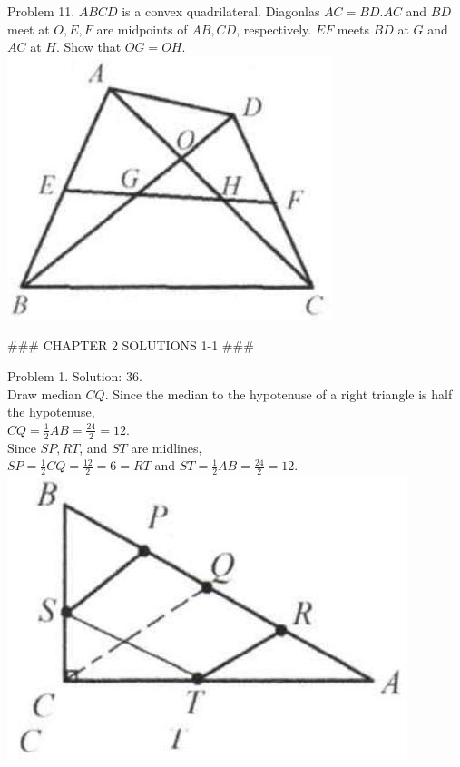 \documentclass[10pt]{article}
\begin{document}
Problem 11. \(A B C D\) is a convex quadrilateral. Diagonlas \(A C=B D . A C\) and \(B D\) meet at \(O, E, F\) are midpoints of \(A B, C D\), respectively. \(E F\) meets \(B D\) at \(G\) and \(A C\) at \(H\). Show that \(O G=O H\).\\
\includegraphics[max width=\textwidth, center]{2025_04_17_97bc1f7e44d93c271a88g-046}


### CHAPTER 2 SOLUTIONS 1-1 ###

Problem 1. Solution: 36.\\
Draw median \(C Q\). Since the median to the hypotenuse of a right triangle is half the hypotenuse,\\
\(C Q=\frac{1}{2} A B=\frac{24}{2}=12\).\\
Since \(S P, R T\), and \(S T\) are midlines,\\
\(S P=\frac{1}{2} C Q=\frac{12}{2}=6=R T\) and \(S T=\frac{1}{2} A B=\frac{24}{2}=12\).\\
\includegraphics[max width=\textwidth, center]{2025_04_17_97bc1f7e44d93c271a88g-047(2)}
\end{document}
